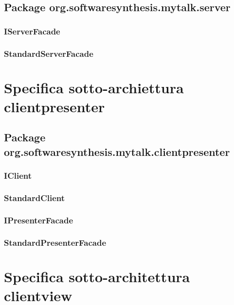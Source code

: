 \subsection{Package org.softwaresynthesis.mytalk.server}\label{sec:server}

\subsubsection{IServerFacade}\label{sec:iserverfacade}

\subsubsection{StandardServerFacade}\label{sec:standardserverfacade}

\clearpage

\section{Specifica sotto-archiettura clientpresenter}\label{clientpresenterarchitecture}

\subsection{Package org.softwaresynthesis.mytalk.clientpresenter}\label{sec:clientpresetner}

\subsubsection{IClient}\label{sec:iclient}

\subsubsection{StandardClient}\label{sec:standardclient}

\subsubsection{IPresenterFacade}\label{sec:ipresenterfacade}

\subsubsection{StandardPresenterFacade}\label{sec:standardserverfacade}

\clearpage

\section{Specifica sotto-architettura clientview}\label{sec:clientviewarchitecture}

